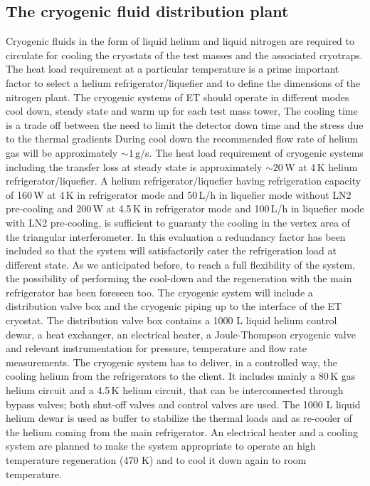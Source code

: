 \subsection{The cryogenic fluid distribution plant}
Cryogenic fluids in the form of liquid helium and liquid nitrogen are required to circulate for cooling the cryostats of the test masses and the associated cryotraps. The heat load requirement at a particular temperature is a prime important factor to select a helium refrigerator/liquefier and to define the dimensions of the nitrogen plant. The cryogenic systems of ET should operate in different modes cool down, steady state and warm up for each test mass tower, The cooling time is a trade off between the need to limit the detector down time and the stress due to the thermal gradients During cool down the recommended flow rate of helium gas will be approximately $\sim 1$\,g/s. The heat load requirement of cryogenic systems including the transfer loss at steady state is approximately $\sim 20$\,W at 4\,K helium refrigerator/liquefier. A helium refrigerator/liquefier having refrigeration capacity of 160\,W at 4\,K in refrigerator mode and 50\,L/h in liquefier mode without LN2 pre-cooling and 200\,W at 4.5\,K in refrigerator mode and 100\,L/h in liquefier mode with LN2 pre-cooling, is sufficient to guaranty the cooling in the vertex area of the triangular interferometer. In this evaluation a redundancy factor has been included so that the system will satisfactorily cater the refrigeration load at different state. As we anticipated before, to reach a full flexibility of the system, the possibility of performing the cool-down and the regeneration with the main refrigerator has been foreseen too. The cryogenic system will include a distribution valve box and the cryogenic piping up to the interface of the ET cryostat. The distribution valve box contains a 1000 L liquid helium control dewar, a heat exchanger, an electrical heater, a Joule-Thompson cryogenic valve and relevant instrumentation for pressure, temperature and flow rate measurements. The cryogenic system has to deliver, in a controlled way, the cooling helium from the refrigerators to the client. It includes mainly a 80\,K gas helium circuit and a 4.5\,K helium circuit, that can be interconnected through bypass valves; both shut-off valves and control valves are used. The 1000 L liquid helium dewar is used as buffer to stabilize the thermal loads and as re-cooler of the helium coming from the main refrigerator. An electrical heater and a cooling system are planned to make the system appropriate to operate an high temperature regeneration (470 K) and to cool it down again to room temperature. 

